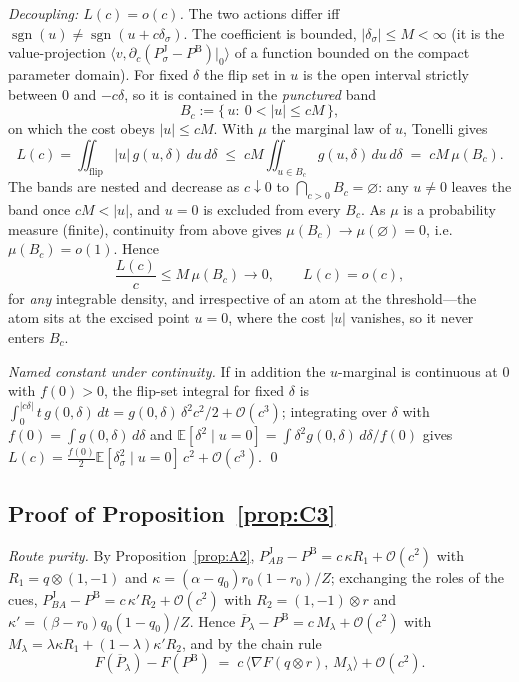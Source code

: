 \documentclass[review,12pt,authoryear]{elsarticle}
\theoremstyle{remark}
\theoremstyle{definition}
\newcommand{\PB}{P^{\mathrm{B}}}
\newcommand{\PJ}{P^{\mathrm{J}}}
\newcommand{\Pbar}{\overline{P}}
\newcommand{\sgn}{\operatorname{sgn}}
\newcommand{\E}{\mathbb{E}}
\newcommand{\bigO}{\mathcal{O}}
\newcommand{\vv}{v}
\begin{document}
\emph{Decoupling: $L(c)=o(c)$.} The two actions differ iff
$\sgn(u)\neq\sgn(u+c\delta_\sigma)$. The coefficient is bounded, $|\delta_\sigma|\le M<\infty$
(it is the value-projection $\langle\vv,\partial_c(\PJ_\sigma-\PB)|_{0}\rangle$ of a function
bounded on the compact parameter domain). For fixed $\delta$ the flip set in $u$ is the open
interval strictly between $0$ and $-c\delta$, so it is contained in the \emph{punctured} band
\[
  B_c:=\{\,u:\ 0<|u|\le cM\,\},
\]
on which the cost obeys $|u|\le cM$. With $\mu$ the marginal law of $u$, Tonelli gives
\[
  L(c)=\iint_{\mathrm{flip}}|u|\,g(u,\delta)\,du\,d\delta
   \;\le\; cM\!\iint_{u\in B_c}\! g(u,\delta)\,du\,d\delta
   \;=\; cM\,\mu(B_c).
\]
The bands are nested and decrease as $c\downarrow0$ to $\bigcap_{c>0}B_c=\varnothing$: any
$u\neq0$ leaves the band once $cM<|u|$, and $u=0$ is excluded from every $B_c$. As $\mu$ is a
probability measure (finite), continuity from above gives $\mu(B_c)\to\mu(\varnothing)=0$, i.e.\
$\mu(B_c)=o(1)$. Hence
\[
  \frac{L(c)}{c}\le M\,\mu(B_c)\longrightarrow0,\qquad L(c)=o(c),
\]
for \emph{any} integrable density, and irrespective of an atom at the threshold---the atom sits
at the excised point $u=0$, where the cost $|u|$ vanishes, so it never enters $B_c$.

\emph{Named constant under continuity.} If in addition the $u$-marginal is continuous at $0$
with $f(0)>0$, the flip-set integral for fixed $\delta$ is
$\int_0^{|c\delta|}t\,g(0,\delta)\,dt=g(0,\delta)\,\delta^{2}c^{2}/2+\bigO(c^3)$; integrating
over $\delta$ with $f(0)=\int g(0,\delta)\,d\delta$ and
$\E[\delta^2\mid u=0]=\int\delta^2 g(0,\delta)\,d\delta/f(0)$ gives
$L(c)=\tfrac{f(0)}{2}\E[\delta_\sigma^2\mid u=0]\,c^{2}+\bigO(c^3)$. \qed

\subsection{Proof of Proposition~\ref{prop:C3}}

\emph{Route purity.} By Proposition~\ref{prop:A2}, $\PJ_{AB}-\PB=c\,\kappa R_1+\bigO(c^2)$ with
$R_1=q\otimes(1,-1)$ and $\kappa=(\alpha-q_0)r_0(1-r_0)/Z$; exchanging the roles of the cues,
$\PJ_{BA}-\PB=c\,\kappa' R_2+\bigO(c^2)$ with $R_2=(1,-1)\otimes r$ and
$\kappa'=(\beta-r_0)q_0(1-q_0)/Z$. Hence $\Pbar_\lambda-\PB=c\,M_\lambda+\bigO(c^2)$ with
$M_\lambda=\lambda\kappa R_1+(1-\lambda)\kappa' R_2$, and by the chain rule
\[
  F(\Pbar_\lambda)-F(\PB)\;=\;c\,\bigl\langle \nabla F(q\otimes r),\,M_\lambda\bigr\rangle+\bigO(c^2).
\]
\end{document}
